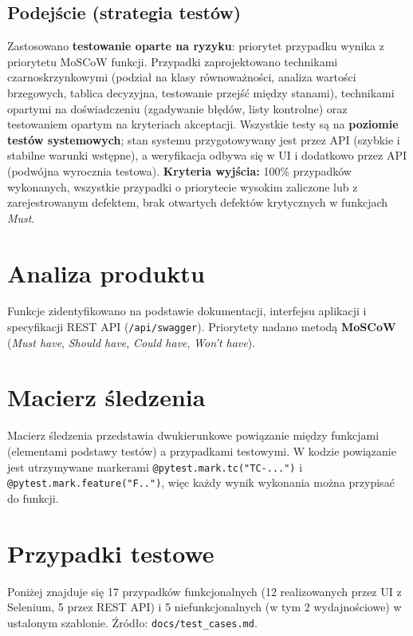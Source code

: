 \documentclass[11pt,a4paper]{article}
\begin{document}
\subsection{Podejście (strategia testów)}
Zastosowano \textbf{testowanie oparte na ryzyku}: priorytet przypadku wynika z priorytetu
MoSCoW funkcji. Przypadki zaprojektowano technikami czarnoskrzynkowymi (podział na klasy
równoważności, analiza wartości brzegowych, tablica decyzyjna, testowanie przejść między
stanami), technikami opartymi na doświadczeniu (zgadywanie błędów, listy kontrolne) oraz
testowaniem opartym na kryteriach akceptacji. Wszystkie testy są na \textbf{poziomie testów
systemowych}; stan systemu przygotowywany jest przez API (szybkie i stabilne warunki wstępne),
a weryfikacja odbywa się w UI i dodatkowo przez API (podwójna wyrocznia testowa).
\textbf{Kryteria wyjścia:} 100\% przypadków wykonanych, wszystkie przypadki o priorytecie
wysokim zaliczone lub z zarejestrowanym defektem, brak otwartych defektów krytycznych
w funkcjach \emph{Must}.

\section{Analiza produktu}\label{sec:analiza}
Funkcje zidentyfikowano na podstawie dokumentacji, interfejsu aplikacji i specyfikacji
REST API (\texttt{/api/swagger}). Priorytety nadano metodą \textbf{MoSCoW}
(\emph{Must have}, \emph{Should have}, \emph{Could have}, \emph{Won't have}).



\section{Macierz śledzenia}
Macierz śledzenia przedstawia dwukierunkowe powiązanie między funkcjami (elementami
podstawy testów) a przypadkami testowymi. W kodzie powiązanie jest utrzymywane markerami
\texttt{@pytest.mark.tc("TC-...")} i \texttt{@pytest.mark.feature("F..")}, więc każdy wynik
wykonania można przypisać do funkcji.



\section{Przypadki testowe}
Poniżej znajduje się 17 przypadków funkcjonalnych (12 realizowanych przez UI z Selenium,
5 przez REST API) i 5 niefunkcjonalnych (w tym 2 wydajnościowe) w ustalonym szablonie.
Źródło: \texttt{docs/test\_cases.md}.
\end{document}
